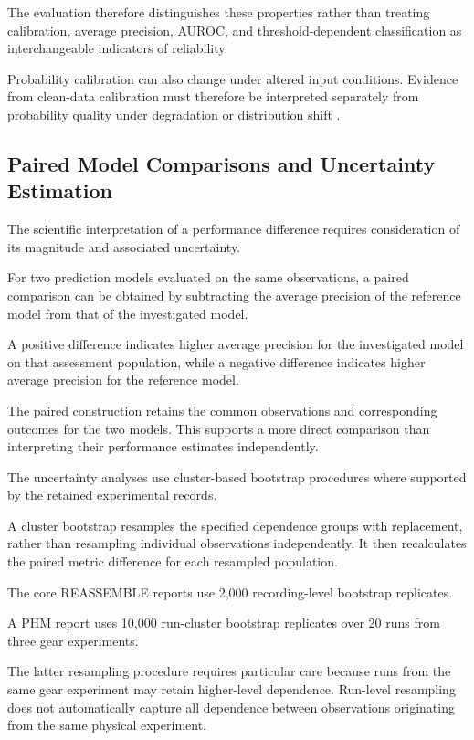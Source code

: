 The evaluation therefore distinguishes these properties rather than treating calibration, average precision, AUROC, and threshold-dependent classification as interchangeable indicators of reliability.

Probability calibration can also change under altered input conditions. Evidence from clean-data calibration must therefore be interpreted separately from probability quality under degradation or distribution shift \parencite{P008}.

\subsection{Paired Model Comparisons and Uncertainty Estimation}

The scientific interpretation of a performance difference requires consideration of its magnitude and associated uncertainty.

For two prediction models evaluated on the same observations, a paired comparison can be obtained by subtracting the average precision of the reference model from that of the investigated model.

A positive difference indicates higher average precision for the investigated model on that assessment population, while a negative difference indicates higher average precision for the reference model.

The paired construction retains the common observations and corresponding outcomes for the two models. This supports a more direct comparison than interpreting their performance estimates independently.

The uncertainty analyses use cluster-based bootstrap procedures where supported by the retained experimental records.

A cluster bootstrap resamples the specified dependence groups with replacement, rather than resampling individual observations independently. It then recalculates the paired metric difference for each resampled population.

The core REASSEMBLE reports use 2,000 recording-level bootstrap replicates.

A PHM report uses 10,000 run-cluster bootstrap replicates over 20 runs from three gear experiments.

The latter resampling procedure requires particular care because runs from the same gear experiment may retain higher-level dependence. Run-level resampling does not automatically capture all dependence between observations originating from the same physical experiment.

